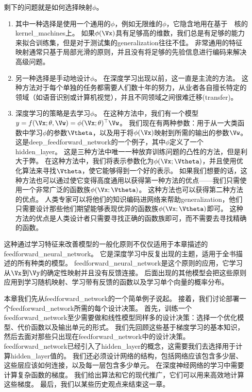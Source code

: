 剩下的问题就是如何选择映射$\phi$。
\begin{enumerate}
\item 其中一种选择是使用一个通用的$\phi$，例如无限维的$\phi$，它隐含地用在基于~~核的\gls{kernel_machines}上。
如果$\phi(\Vx)$具有足够高的维数，我们总是有足够的能力来拟合训练集，但是对于测试集的\gls{generalization}往往不佳。
非常通用的特征映射通常只基于局部光滑的原则，并且没有将足够的先验信息进行编码来解决高级问题。

\item 另一种选择是手动地设计$\phi$。
在深度学习出现以前，这一直是主流的方法。
这种方法对于每个单独的任务都需要人们数十年的努力，从业者各自擅长特定的领域（如语音识别或计算机视觉），并且不同领域之间很难迁移(transfer)。

\item 深度学习的策略是去学习$\phi$。
在这种方法中，我们有一个模型$y = f(\Vx;\theta, \Vw) = \phi(\Vx; \theta)^\top \Vw$。
我们现在有两种参数：用于从一大类函数中学习$\phi$的参数$\Vtheta$，以及用于将$\phi(\Vx)$映射到所需的输出的参数$\Vw$。
这是\gls{deep_feedforward_network}的一个例子，其中$\phi$定义了一个\gls{hidden_layer}。
这是三种方法中唯一一种放弃训练问题的凸性的方法，但是利大于弊。
在这种方法中，我们将表示参数化为$\phi(\Vx; \Vtheta)$，并且使用优化算法来寻找$\Vtheta$，使它能够得到一个好的表示。
如果我们想要的话，这种方法也可以通过使它变得高度通用以获得第一种方法的优点——我们只需使用一个非常广泛的函数族$\phi(\Vx; \Vtheta)$。
这种方法也可以获得第二种方法的优点。
人类专家可以将他们的知识编码进网络来帮助\gls{generalization}，他们只需要设计那些他们期望能够表现优异的函数族$\phi(\Vx; \Vtheta)$即可。
这种方法的优点是人类设计者只需要寻找正确的函数族即可，而不需要去寻找精确的函数。
\end{enumerate}

这种通过学习特征来改善模型的一般化原则不仅仅适用于本章描述的\gls{feedforward_neural_network}。
它是深度学习中反复出现的主题，适用于全书描述的所有种类的模型。
\gls{feedforward_neural_network}是这个原则的应用，它学习从$\Vx$到$\Vy$的确定性映射并且没有反馈连接。
后面出现的其他模型会把这些原则应用到学习随机映射、学习带有反馈的函数以及学习单个向量的概率分布。


本章我们先从\gls{feedforward_network}的一个简单例子说起。
接着，我们讨论部署一个\gls{feedforward_network}所需的每个设计决策。
首先，训练一个\gls{feedforward_network}至少需要做和线性模型同样多的设计决策：选择一个优化模型、代价函数以及输出单元的形式。
我们先回顾这些基于梯度学习的基本知识，然后去面对那些只出现在\gls{feedforward_network}中的设计决策。
\gls{feedforward_network}已经引入了\gls{hidden_layer}的概念，这需要我们去选择用于计算\gls{hidden_layer}值的。
我们还必须设计网络的结构，包括网络应该包含多少层、这些层应该如何连接，以及每一层包含多少单元。
在深度神经网络的学习中需要计算复杂函数的梯度。
我们给出算法和它的现代推广，它们可以用来高效地计算这些梯度。
最后，我们以某些历史观点来结束这一章。

